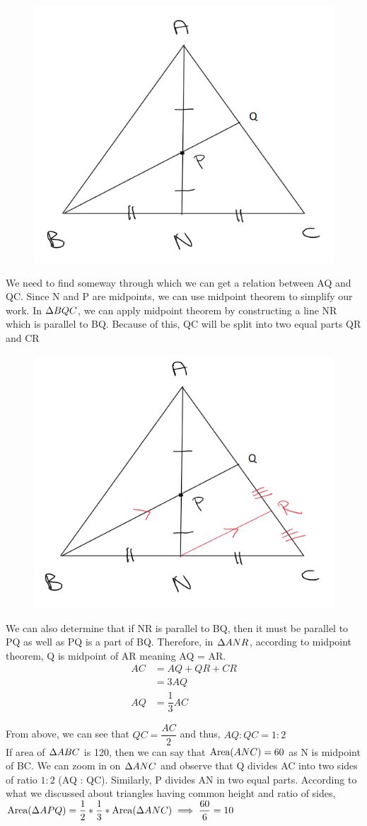 \begin{figure}[h!]
    \centering
    \includegraphics[width=0.35\linewidth]{Quant//Geometry//Images//Triangles/triangle_12_midpt_q2_img.png}
\end{figure}

We need to find someway through which we can get a relation between AQ and QC. Since N and P are midpoints, we can use midpoint theorem to simplify our work. In $\Delta {BQC}$, we can apply midpoint theorem by constructing a line NR which is parallel to BQ. Because of this, QC will be split into two equal parts QR and CR

\begin{figure}[h!]
    \centering
    \includegraphics[width=0.35\linewidth]{Quant//Geometry//Images//Triangles/triangle_12_midpt_q2_ans_image_1.png}
\end{figure}

We can also determine that if NR is parallel to BQ, then it must be parallel to PQ as well as PQ is a part of BQ. Therefore, in $\Delta {ANR}$, according to midpoint theorem, Q is midpoint of AR meaning AQ = AR. 
\begin{align*}
    AC &= AQ + QR + CR \\
    &= 3 AQ \tag{AQ = QR and QR = RC as proved above} \\
    AQ &= \dfrac{1}{3} AC
\end{align*}

From above, we can see that $QC = \dfrac{AC}{2}$ and thus, $AQ : QC = 1 : 2$ \\

If area of $\Delta {ABC}$ is 120, then we can say that $\text{Area}({ANC}) = 60$ as N is midpoint of BC. We can zoom in on $\Delta {ANC}$ and observe that Q divides AC into two sides of ratio $1 : 2$ (AQ : QC). Similarly, P divides AN in two equal parts. According to what we discussed about triangles having common height and ratio of sides, $\text{Area}({\Delta {APQ}}) = \dfrac{1}{2} * \dfrac{1}{3} * \text{Area}({\Delta {ANC}}) \implies \dfrac{60}{6} = 10$

